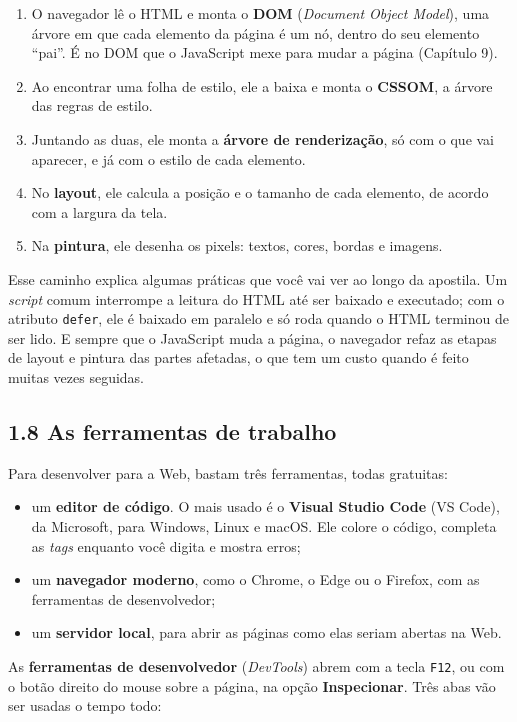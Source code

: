 \begin{enumerate}
  \item O navegador lê o HTML e monta o \textbf{DOM} (\textit{Document Object Model}), uma árvore em que cada elemento da página é um nó, dentro do seu elemento ``pai''. É no DOM que o JavaScript mexe para mudar a página (Capítulo 9).
  \item Ao encontrar uma folha de estilo, ele a baixa e monta o \textbf{CSSOM}, a árvore das regras de estilo.
  \item Juntando as duas, ele monta a \textbf{árvore de renderização}, só com o que vai aparecer, e já com o estilo de cada elemento.
  \item No \textbf{layout}, ele calcula a posição e o tamanho de cada elemento, de acordo com a largura da tela.
  \item Na \textbf{pintura}, ele desenha os pixels: textos, cores, bordas e imagens.
\end{enumerate}

Esse caminho explica algumas práticas que você vai ver ao longo da apostila. Um \textit{script} comum interrompe a leitura do HTML até ser baixado e executado; com o atributo \texttt{defer}, ele é baixado em paralelo e só roda quando o HTML terminou de ser lido. E sempre que o JavaScript muda a página, o navegador refaz as etapas de layout e pintura das partes afetadas, o que tem um custo quando é feito muitas vezes seguidas.

\subsection{1.8 As ferramentas de trabalho}

Para desenvolver para a Web, bastam três ferramentas, todas gratuitas:

\begin{itemize}
  \item um \textbf{editor de código}. O mais usado é o \textbf{Visual Studio Code} (VS Code), da Microsoft, para Windows, Linux e macOS. Ele colore o código, completa as \textit{tags} enquanto você digita e mostra erros;
  \item um \textbf{navegador moderno}, como o Chrome, o Edge ou o Firefox, com as ferramentas de desenvolvedor;
  \item um \textbf{servidor local}, para abrir as páginas como elas seriam abertas na Web.
\end{itemize}

As \textbf{ferramentas de desenvolvedor} (\textit{DevTools}) abrem com a tecla \texttt{F12}, ou com o botão direito do mouse sobre a página, na opção \textbf{Inspecionar}. Três abas vão ser usadas o tempo todo:

